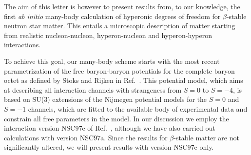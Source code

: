 The aim of this letter is 
however to present results from, to our knowledge,
 the first  {\em ab initio}
many-body calculation of hyperonic degrees of freedom 
for $\beta$-stable neutron star matter. 
This entails a microscopic
description of matter starting from 
realistic nucleon-nucleon, hyperon-nucleon
and hyperon-hyperon interactions. 

To achieve this goal, 
our many-body scheme starts with the most recent 
parametrization
of the free baryon-baryon potentials 
for the complete  baryon octet
as defined by Stoks and Rijken in Ref.\ 
\cite{sr99}. 
This potential model, which aims at describing all 
interaction channels
with strangeness from $S=0$ to $S=-4$, 
is based on SU(3) extensions
of the Nijmegen potential models \cite{rsy98} 
for the $S=0$ and $S=-1$ channels, which
are fitted to the available body of experimental 
data and constrain all free parameters in the model. 
In our discussion we employ 
the interaction version NSC97e of Ref.\ \cite{sr99}, although
we have also carried out calculations with version NSC97a. 
Since the results for $\beta$-stable matter are not significantly altered,
we will present results with version NSC97e only. 

